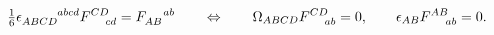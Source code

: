 \begin{equation}
\label{2.7}
\hbox{$\frac{1}{6}$} \epsilon_{ABCD}^{\!~~~~~~~~abcd} F^{CD}_{\!~~~~cd} =
F_{AB}^{\!~~~~ab}
\qquad
\Leftrightarrow
\qquad
\Omega_{ABCD} F^{CD}_{\!~~~~ab} = 0,
\qquad
\epsilon_{AB} F^{AB}_{\!~~~~ab} = 0.
\end{equation}


